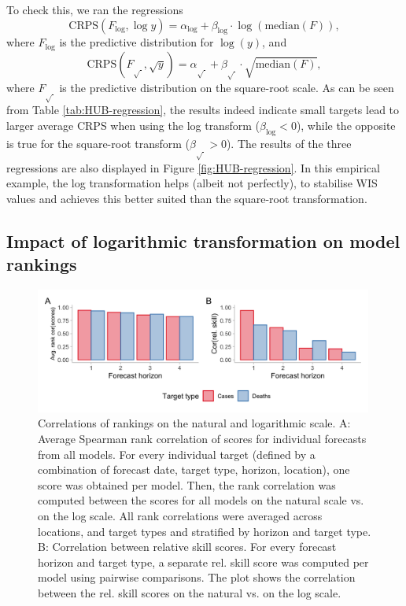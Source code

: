 \documentclass{article}
\begin{document}
To check this, we ran the regressions
\begin{equation*}
    \text{CRPS}(F_{\log}, \log y) = \alpha_{\log} + \beta_{\log} \cdot \log{(\text{median}(F))},
\end{equation*}
where $F_{\log}$ is the predictive distribution for $\log(y)$, and
\begin{equation*}
    \text{CRPS}(F_{\sqrt{\ }}, \sqrt{y}) = \alpha_{\sqrt{\ }} + \beta_{\sqrt{\ }} \cdot \sqrt{\text{median}(F)},
\end{equation*} 
where $F_{\sqrt{\ }}$ is the predictive distribution on the square-root scale. As can be seen from Table \ref{tab:HUB-regression}, the results indeed indicate small targets lead to larger average CRPS when using the log transform ($\beta_{\log} < 0$), while the opposite is true for the square-root transform ($\beta_{\sqrt{\ }} > 0$). The results of the three regressions are also displayed in Figure \ref{fig:HUB-regression}. In this empirical example, the log transformation helps (albeit not perfectly), to stabilise WIS values and achieves this better suited than the square-root transformation. 

\subsection{Impact of logarithmic transformation on model rankings}

\begin{figure}[h!]
    \centering
    \includegraphics[width=0.99\textwidth]{output/figures/HUB-correlations.png}
    \caption{Correlations of rankings on the natural and logarithmic scale. A: Average Spearman rank correlation of scores for individual forecasts from all models. For every individual target (defined by a combination of forecast date, target type, horizon, location), one score was obtained per model. Then, the rank correlation was computed between the scores for all models on the natural scale vs. on the log scale. All rank correlations were averaged across locations, and target types and stratified by horizon and target type. B: Correlation between relative skill scores. For every forecast horizon and target type, a separate rel. skill score was computed per model using pairwise comparisons. The plot shows the correlation between the rel. skill scores on the natural vs. on the log scale.}
    \label{fig:HUB-cors}
\end{figure}
\end{document}
